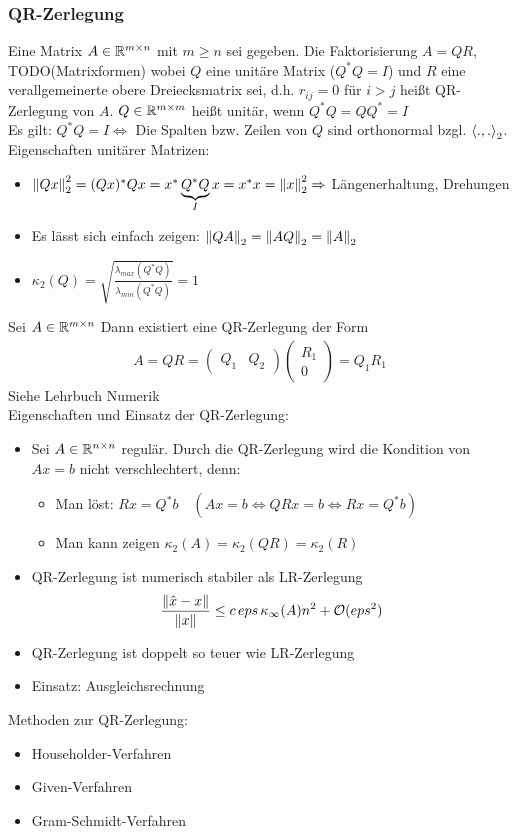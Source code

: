 \subsubsection{QR-Zerlegung}
 Eine Matrix $A \in \mathbb{R}^{m \times n}$ mit $m \geq n$ sei gegeben. Die Faktorisierung $A = QR$, TODO(Matrixformen) wobei $Q$
eine unitäre Matrix ($Q^*Q=I$) und $R$ eine verallgemeinerte obere Dreiecksmatrix sei, 
d.h. $r_{ij} = 0$ für $i > j$ heißt QR-Zerlegung von $A$.
 $Q \in \mathbb{R}^{m \times m}$ heißt unitär, wenn $Q^*Q=QQ^*=I$\\
Es gilt: $Q^*Q=I \Leftrightarrow$ Die Spalten bzw. Zeilen von $Q$ sind orthonormal bzgl. $\left\langle ., . \right\rangle_2$.\\
Eigenschaften unitärer Matrizen:
\begin{itemize}
  \item $\left\lVert Qx \right\rVert_2^2 = (Qx)^*Qx = x^*\underbrace{Q^*Q}_{I}x = x^*x = \left\lVert x \right\rVert_2^2 \Rightarrow$ Längenerhaltung, Drehungen
  \item Es lässt sich einfach zeigen: $\left\lVert QA \right\rVert_2 = \left\lVert AQ \right\rVert_2 = \left\lVert A \right\rVert_2$
  \item $\kappa_2(Q) = \sqrt{\frac{\lambda_{max}(Q^*Q)}{\lambda_{min}(Q^*Q)}} = 1$
\end{itemize}
\satz Sei $A \in \mathbb{R}^{m \times n}$ Dann existiert eine QR-Zerlegung der Form 
\begin{align*}
  A=QR=\begin{pmatrix} Q_1 & Q_2 \end{pmatrix} \begin{pmatrix} R_1 \\ 0 \end{pmatrix} = Q_1 R_1
\end{align*}
\beweis Siehe Lehrbuch Numerik\\
Eigenschaften und Einsatz der QR-Zerlegung:
\begin{itemize}
  \item Sei $A \in \mathbb{R}^{n \times n}$ regulär. Durch die QR-Zerlegung wird die Kondition von $Ax=b$ nicht verschlechtert, denn:
    \begin{itemize}
      \item Man löst: $Rx = Q^*b \quad (Ax = b \Leftrightarrow QRx = b \Leftrightarrow Rx = Q^*b)$
      \item Man kann zeigen $\kappa_2(A) = \kappa_2(QR) = \kappa_2(R)$
    \end{itemize}
  \item QR-Zerlegung ist numerisch stabiler als LR-Zerlegung \begin{align*}
      \frac{\left\lVert \hat{x} - x \right\rVert}{\left\lVert x \right\rVert} \leq c\,eps\,\kappa_\infty(A)n^2 + \mathcal{O}(eps^2)
    \end{align*}
  \item QR-Zerlegung ist doppelt so teuer wie LR-Zerlegung
  \item Einsatz: Ausgleichsrechnung
\end{itemize}
Methoden zur QR-Zerlegung:
\begin{itemize}
  \item Householder-Verfahren
  \item Given-Verfahren
  \item Gram-Schmidt-Verfahren
\end{itemize}

